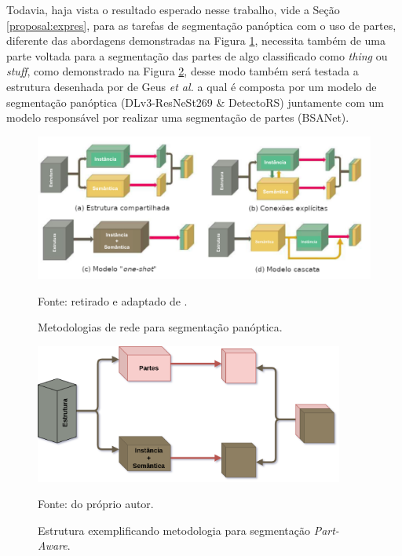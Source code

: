 Todavia, haja vista o resultado esperado nesse trabalho, vide a Seção \ref{proposal:expres}, para as tarefas de segmentação panóptica com o uso de partes, diferente das abordagens demonstradas na Figura \ref{proposal:method:fig:1}, necessita também de uma parte voltada para a segmentação das partes de algo classificado como \textit{thing} ou \textit{stuff}, como demonstrado na Figura \ref{proposal:method:fig:2}, desse modo também será testada a estrutura desenhada por de Geus \textit{et al.} \cite{DeGeus2021} a qual é composta por um modelo de segmentação panóptica (DLv3-ResNeSt269 \& DetectoRS) juntamente com um modelo responsável por realizar uma segmentação de partes (BSANet).

\begin{figure}[H]
    \centering
    \caption{Metodologias de rede para segmentação panóptica.}
    \includegraphics[width=1\textwidth]{recursos/imagens/proposal/model_methodologies.png}
    \label{proposal:method:fig:1}

    \vspace*{1 cm}
    Fonte: retirado e adaptado de \cite{Elharrouss2021}.
\end{figure}

\begin{figure}[H]
    \centering
    \caption{Estrutura exemplificando metodologia para segmentação \textit{Part-Aware}.}
    \includegraphics[width=4in]{recursos/imagens/proposal/estrutura.png}
    \label{proposal:method:fig:2}

    \vspace*{1 cm}
    Fonte: do próprio autor.
\end{figure}


